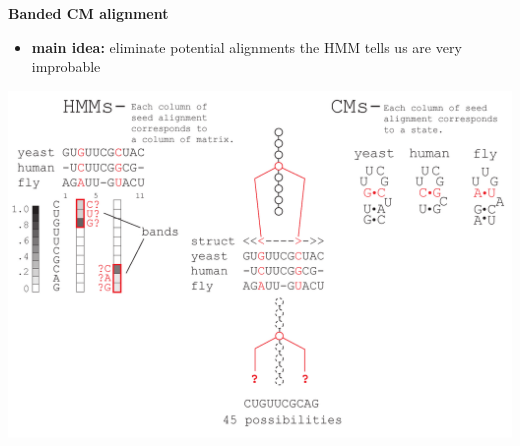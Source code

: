 \documentclass[landscape]{slides}
\begin{document}
\begin{slide}
\begin{center}
\large
\textbf{Banded CM alignment}
\end{center}
\medskip
\small
\begin{itemize}
\item
\textbf{main idea:} eliminate potential alignments the HMM tells us are very improbable
\end{itemize}
\begin{center}
\includegraphics[width=8in]{figs/post_hmm_to_cm_map2_layer15}
\end{center}
\vfill
\end{slide}
\end{document}
